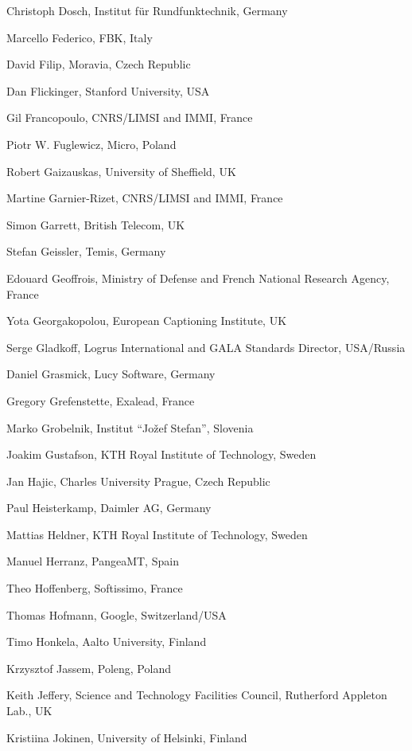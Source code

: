 \documentclass[10pt, plain]{../../metanetpaper}
\begin{document}
\begin{multicols}{3}
\begin{small}
\begin{enumerate}
{      \item Christoph Dosch, Institut für Rundfunktechnik, Germany
      \item Marcello Federico, FBK, Italy
      \item David Filip, Moravia, Czech Republic
      \item Dan Flickinger, Stanford University, USA
      \item Gil Francopoulo, CNRS/LIMSI and IMMI, France
      \item Piotr W. Fuglewicz, Micro, Poland
      \item Robert Gaizauskas, University of Sheffield, UK
      \item Martine Garnier-Rizet, CNRS/LIMSI and IMMI, France
      \item Simon Garrett, British Telecom, UK
      \item Stefan Geissler, Temis, Germany
      \item Edouard Geoffrois, Ministry of Defense and French National Research Agency, France
      \item Yota Georgakopolou, European Captioning Institute, UK
      \item Serge Gladkoff, Logrus International and GALA Standards Director, USA/Russia
      \item Daniel Grasmick, Lucy Software, Germany
      \item Gregory Grefenstette, Exalead, France
      \item Marko Grobelnik, Institut ``Jožef Stefan'', Slovenia
      \item Joakim Gustafson, KTH Royal Institute of Technology, Sweden
      \item Jan Hajic, Charles University Prague, Czech Republic
      \item Paul Heisterkamp, Daimler AG, Germany
      \item Mattias Heldner, KTH Royal Institute of Technology, Sweden
      \item Manuel Herranz, PangeaMT, Spain
      \item Theo Hoffenberg, Softissimo, France
      \item Thomas Hofmann, Google, Switzerland/USA
      \item Timo Honkela, Aalto University, Finland
      \item Krzysztof Jassem, Poleng, Poland
      \item Keith Jeffery, Science and Technology Facilities Council, Rutherford Appleton Lab., UK
      \item Kristiina Jokinen, University of Helsinki, Finland
}
\end{enumerate}
\end{small}
\end{multicols}
\end{document}
